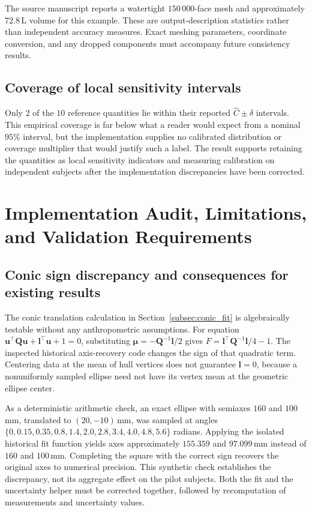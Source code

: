 The source manuscript reports a watertight $150\,000$-face mesh and approximately $72.8$\,L volume for this example. These are output-description statistics rather than independent accuracy measures. Exact meshing parameters, coordinate conversion, and any dropped components must accompany future consistency results.

\subsection{Coverage of local sensitivity intervals}
Only $2$ of the $10$ reference quantities lie within their reported $\hat C\pm\delta$ intervals. This empirical coverage is far below what a reader would expect from a nominal $95\%$ interval, but the implementation supplies no calibrated distribution or coverage multiplier that would justify such a label. The result supports retaining the quantities as local sensitivity indicators and measuring calibration on independent subjects after the implementation discrepancies have been corrected.

\section{Implementation Audit, Limitations, and Validation Requirements}
\label{sec:discussion}
\subsection{Conic sign discrepancy and consequences for existing results}
\label{subsec:conic_audit}
The conic translation calculation in Section~\ref{subsec:conic_fit} is algebraically testable without any anthropometric assumptions. For equation $\mathbf u^\top\mathbf Q\mathbf u+\mathbf l^\top\mathbf u+1=0$, substituting $\boldsymbol\mu=-\mathbf Q^{-1}\mathbf l/2$ gives $F=\mathbf l^\top\mathbf Q^{-1}\mathbf l/4-1$. The inspected historical axis-recovery code changes the sign of that quadratic term. Centering data at the mean of hull vertices does not guarantee $\mathbf l=0$, because a nonuniformly sampled ellipse need not have its vertex mean at the geometric ellipse center.

As a deterministic arithmetic check, an exact ellipse with semiaxes $160$ and $100$\,mm, translated to $(20,-10)$\,mm, was sampled at angles $\{0,0.15,0.35,0.8,1.4,2.0,2.8,3.4,4.0,4.8,5.6\}$ radians. Applying the isolated historical fit function yields axes approximately $155.359$ and $97.099$\,mm instead of $160$ and $100$\,mm. Completing the square with the correct sign recovers the original axes to numerical precision. This synthetic check establishes the discrepancy, not its aggregate effect on the pilot subjects. Both the fit and the uncertainty helper must be corrected together, followed by recomputation of measurements and uncertainty values.

